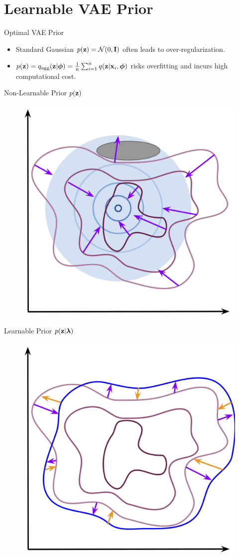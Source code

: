 \documentclass{beamer}
\begin{document}
\section{Learnable VAE Prior}
\begin{frame}{Optimal VAE Prior}
	\begin{itemize}
		\item Standard Gaussian $p(\mathbf{z}) = \mathcal{N}(0, \mathbf{I})$ often leads to over-regularization.
		\item $p(\mathbf{z}) = q_{\text{agg}}(\mathbf{z} | \boldsymbol{\phi}) = \frac{1}{n}\sum_{i=1}^n q(\mathbf{z} | \mathbf{x}_i, \boldsymbol{\phi})$ risks overfitting and incurs high computational cost.
	\end{itemize}
	\vspace{-0.5cm}
	\begin{minipage}[t]{0.5\columnwidth}
		\begin{block}{Non-Learnable Prior $p(\mathbf{z})$}
			\begin{figure}[h]
				\centering
				\includegraphics[width=0.6\linewidth]{figs/non_learnable_prior}
			\end{figure}
		\end{block}
	\end{minipage}%
	\begin{minipage}[t]{0.5\columnwidth}
		\begin{block}{Learnable Prior $p(\mathbf{z} | \boldsymbol{\lambda})$}
			\begin{figure}[h]
				\centering
				\includegraphics[width=0.6\linewidth]{figs/learnable_prior}

\end{figure}
\end{block}
\end{minipage}
\end{frame}
\end{document}

